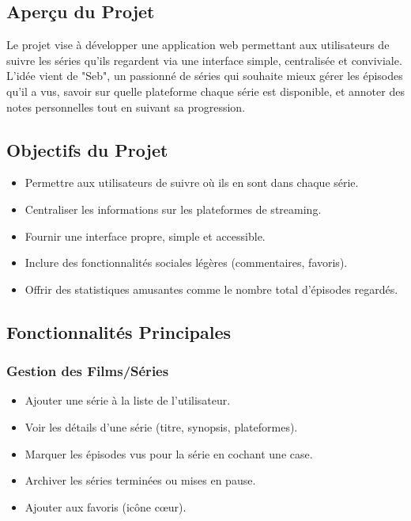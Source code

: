 \subsection{Aperçu du Projet}
Le projet vise à développer une application web permettant aux utilisateurs de suivre les séries qu'ils regardent via une interface simple, centralisée et conviviale. L'idée vient de "Seb", un passionné de séries qui souhaite mieux gérer les épisodes qu'il a vus, savoir sur quelle plateforme chaque série est disponible, et annoter des notes personnelles tout en suivant sa progression.

\subsection{Objectifs du Projet}
\begin{itemize}
    \item Permettre aux utilisateurs de suivre où ils en sont dans chaque série.
    \item Centraliser les informations sur les plateformes de streaming.
    \item Fournir une interface propre, simple et accessible.
    \item Inclure des fonctionnalités sociales légères (commentaires, favoris).
    \item Offrir des statistiques amusantes comme le nombre total d'épisodes regardés.
\end{itemize}

\subsection{Fonctionnalités Principales}

\subsubsection{Gestion des Films/Séries}
\begin{itemize}
    \item Ajouter une série à la liste de l'utilisateur.
    \item Voir les détails d'une série (titre, synopsis, plateformes).
    \item Marquer les épisodes vus pour la série en cochant une case.
    \item Archiver les séries terminées ou mises en pause.
    \item Ajouter aux favoris (icône cœur).
\end{itemize}

